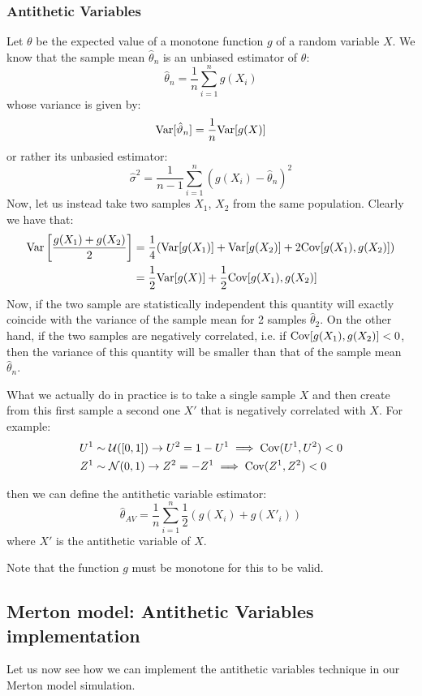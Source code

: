 \subsubsection{Antithetic Variables}
Let $\theta$ be the expected value of a monotone function $g$ of a random
variable $X$. We know that the sample mean $\hat{\theta}_n$ is an unbiased
estimator of $\theta$:
\[ \hat{\theta}_n = \frac{1}{n} \sum_{i=1}^n g(X_i) \]
whose variance is given by:
\[ \text{Var}[\hat{\vartheta}_n] = \frac{1}{n} \text{Var}[g(X)] \]
or rather its unbasied estimator:
\[ \hat{\sigma}^2 = \frac{1}{n-1} \sum_{i=1}^n (g(X_i) - \hat{\theta}_n)^2 \]
Now, let us instead take two samples $X_1$, $X_2$ from the same population.
Clearly we have that:
\begin{align*}
    \text{Var} \left[ \frac{g(X_1) + g(X_2)}{2} \right] & = \frac{1}{4} ( \text{Var}[g(X_1)]
        + \text{Var}[g(X_2)] + 2\text{Cov}[g(X_1), g(X_2)]) \\
    & = \frac{1}{2} \text{Var}[g(X)] + \frac{1}{2} \text{Cov}[g(X_1), g(X_2)]
\end{align*}
Now, if the two sample are statistically independent this quantity will exactly
coincide with the variance of the sample mean for 2 samples $\hat{\theta}_2$.
On the other hand, if the two samples are negatively correlated, i.e. if
$\text{Cov}[g(X_1), g(X_2)] < 0$, then the variance of this quantity will be smaller
than that of the sample mean $\hat{\theta}_n$.

What we actually do in practice is to take a single sample $X$ and then create
from this first sample a second one $X'$ that is negatively correlated with $X$.
For example:
\begin{align*}
    U^1 & \sim \mathcal{U}([0,1]) \rightarrow U^2 = 1 - U^1 \implies
    \text{Cov}(U^1,U^2) < 0 \\
    Z^1 & \sim \mathcal{N}(0,1) \rightarrow Z^2 = -Z^1 \implies \text{Cov}(Z^1, Z^2)
    < 0
\end{align*}

then we can define the antithetic variable estimator:
\[ \hat{\theta}_{AV} = \frac{1}{n} \sum_{i=1}^n \frac{1}{2}\left( g(X_i) + g(X'_i) \right) \]
where $X'$ is the antithetic variable of $X$.

\begin{remark*}
Note that the function $g$ must be monotone for this to be valid. 
\end{remark*}

\subsection{Merton model: Antithetic Variables implementation}
Let us now see how we can implement the antithetic variables technique in our
Merton model simulation.
 
